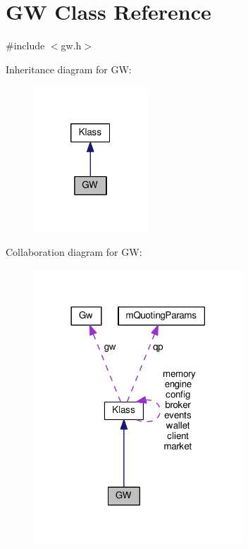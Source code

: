 \hypertarget{class_k_1_1_g_w}{}\section{GW Class Reference}
\label{class_k_1_1_g_w}


{\ttfamily \#include $<$gw.\+h$>$}



Inheritance diagram for GW\+:
\nopagebreak
\begin{figure}[H]
\begin{center}
\leavevmode
\includegraphics[width=121pt]{class_k_1_1_g_w__inherit__graph}
\end{center}
\end{figure}


Collaboration diagram for GW\+:
\nopagebreak
\begin{figure}[H]
\begin{center}
\leavevmode
\includegraphics[width=222pt]{class_k_1_1_g_w__coll__graph}
\end{center}
\end{figure}
